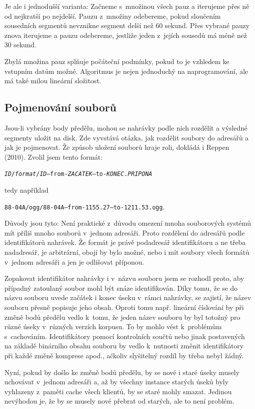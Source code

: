 Je ale i jednodušší varianta: Začneme s~množinou všech pauz a iterujeme přes ně
od nejkratší po nejdelší. Pauzu z~množiny odebereme, pokud sloučením sousedních
segmentů nevznikne segment delší než 60 sekund. Přes vybrané pauzy znova
iterujeme a pauzu odebereme, jestliže jeden z~jejích sousedů má méně než 30
sekund.

Zbylá množina pauz splňuje počáteční podmínky, pokud to je vzhledem ke vstupním
datům možné. Algoritmus je nejen jednoduchý na naprogramování, ale má také milou
lineární složitost.

\subsection{Pojmenování souborů}

Jsou-li vybrány body předělu, mohou se nahrávky podle nich rozdělit a výsledné
segmenty uložit na disk. Zde vyvstává otázka, jak rozdělit soubory do adresářů a
jak je pojmenovat. Že způsob uložení souborů hraje roli, dokládá i Reppen (2010)\cite{reppen2010building}. Zvolil jsem tento formát:

\texttt{{\em{}ID}/{\em{}format}/{\em{}ID}--from-{\em{}ZACATEK}--to-{\em{}KONEC}.{\em{}PRIPONA}}

tedy například

\texttt{88-04A/ogg/88-04A--from-1155.27--to-1211.53.ogg}.

Důvody jsou tyto: Není praktické z~důvodu omezení mnoha souborových systémů mít
příliš mnoho souborů v~jednom adresáři. Proto rozdělení do adresářů podle
identifikátorů nahrávek. Že formát je právě podadresář identifikátoru a ne třeba
nadadresář, je arbitrární, obojí by bylo možné, nebo i mít soubory všech formátů
v~jednom adresáři a jen je odlišovat příponou.

Zopakovat identifikátor nahrávky i v~názvu souboru jsem se rozhodl proto, aby
případný zatoulaný soubor mohl být snáze identifikován. Díky tomu, že se do
názvu souboru uvede začátek i konec úseku v~rámci nahrávky, se zajistí, že název
souboru přesně popisuje jeho obsah. Oproti tomu např. lineární číslování by při
změně bodů předělu vedlo k~tomu, že jeden název souboru by byl totožný pro různé
úseky v~různých verzích korpusu. To by mohlo vést k~problémům s~cachováním.
Identifikátory pomocí kontrolních součtů nebo jinak postavených na základě
binárního obsahu souboru by vedlo k~nutnosti změnit identifikátory při každé
změně komprese apod., ačkoliv slyšitelný rozdíl by třeba nebyl žádný.

Nyní, pokud by došlo ke změně bodů předělu, by se nové i staré úseky musely
uchovávat v~jednom adresáři a, až by všechny instance starých úseků byly
vyhlazeny z~paměti cache všech klientů, by se staré mohly smazat. Jedinou
nevýhodou je, že by se musely nové přebrat od starých, ale to není problém.

